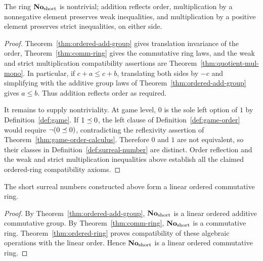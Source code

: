 \begin{theorem}
  \label{thm:ordered-ring}
  \leanok
  The ring \(\mathbf{No}_{\mathrm{short}}\) is nontrivial; addition reflects order, multiplication by a
  nonnegative element preserves weak inequalities, and multiplication by a positive element
  preserves strict inequalities, on either side.
\end{theorem}
\begin{proof}
  \leanok
  Theorem~\ref{thm:ordered-add-group} gives translation invariance of the
  order, Theorem~\ref{thm:comm-ring} gives the commutative ring laws, and the
  weak and strict multiplication compatibility assertions are
  Theorem~\ref{thm:quotient-mul-mono}.  In particular, if
  \(c+a\leq c+b\), translating both sides by \(-c\) and simplifying with the
  additive group laws of Theorem~\ref{thm:ordered-add-group} gives
  \(a\leq b\).  Thus addition reflects order as required.

  It remains to supply nontriviality.  At game level, \(0\) is the sole left
  option of \(1\) by Definition~\ref{def:game}.  If \(1\preceq0\), the left
  clause of Definition~\ref{def:game-order} would require
  \(\neg(0\preceq0)\), contradicting the reflexivity assertion of
  Theorem~\ref{thm:game-order-calculus}.  Therefore \(0\) and \(1\) are not
  equivalent, so their classes in Definition~\ref{def:surreal-number} are
  distinct.  Order reflection and the weak and strict multiplication
  inequalities above establish all the claimed ordered-ring
  compatibility axioms.
\end{proof}

\begin{corollary}
  \label{thm:main-endpoint}
  \leanok
  The short surreal numbers constructed above form a linear ordered commutative ring.
\end{corollary}
\begin{proof}
  \leanok
  By Theorem~\ref{thm:ordered-add-group}, \(\mathbf{No}_{\mathrm{short}}\) is a linear ordered
  additive commutative group.  By Theorem~\ref{thm:comm-ring}, \(\mathbf{No}_{\mathrm{short}}\) is
  a commutative ring.
  Theorem~\ref{thm:ordered-ring} proves compatibility of these algebraic
  operations with the linear order.  Hence \(\mathbf{No}_{\mathrm{short}}\) is a linear ordered
  commutative ring.
\end{proof}
